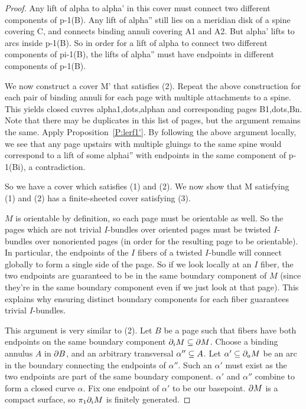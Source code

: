 \begin{proof}
Any lift of alpha to alpha' in this cover must connect two different components
of p-1(B).  Any lift of alpha'' still lies on a meridian disk of a spine
covering C, and connects binding annuli covering A1 and A2. But alpha' lifts to
arcs inside p-1(B). So in order for a lift of alpha to connect two different
components of pi-1(B), the lifts of alpha'' must have endpoints in different
components of p-1(B).

We now construct a cover M' that satisfies (2). Repeat the above construction
for each pair of binding annuli for each page with multiple attachments to
a spine. This yields closed cuvres alpha1,dots,alphan and corresponding pages
B1,dots,Bn. Note that there may be duplicates in this list of pages, but the
argument remains the same. Apply Proposition~\ref{P:lerf1'}. By following the
above argument locally, we see that any page upstairs with multiple gluings to
the same spine would correspond to a lift of some alphai'' with endpoints in
the same component of p-1(Bi), a contradiction.

So we have a cover which satisfies (1) and (2). We now show that M satisfying
(1) and (2) has a finite-sheeted cover satisfying (3).

$M$ is orientable by definition, so each page must be orientable as well. So
the pages which are not trivial $I$-bundles over oriented pages must be twisted
$I$-bundles over nonoriented pages (in order for the resulting page to be
orientable). In particular, the endpoints of the $I$ fibers of a twisted
$I$-bundle will connect globally to form a single side of the page. So if we
look locally at an $I$ fiber, the two endpoints are guaranteed to be in the
same boundary component of $M$ (since they're in the same boundary component
even if we just look at that page). This explains why ensuring distinct
boundary components for each fiber guarantees trivial $I$-bundles.

This argument is very similar to (2). Let $B$ be a page such that fibers have
both endpoints on the same boundary component $\partial_i M \subseteq \partial M$.  Choose
a binding annulus $A$ in $\partial B$, and an arbitrary transversal $\alpha'' \subseteq
A$.  Let $\alpha' \subseteq \partial_a M$ be an arc in the boundary connecting the
endpoints of $\alpha''$. Such an $\alpha'$ must exist as the two endpoints are
part of the same boundary component. $\alpha'$ and $\alpha''$ combine to form
a closed curve $\alpha$.  Fix one endpoint of $\alpha'$ to be our basepoint.
$\partial M$ is a compact surface, so $\pi_1 \partial_i M$ is finitely generated.


\end{proof}

